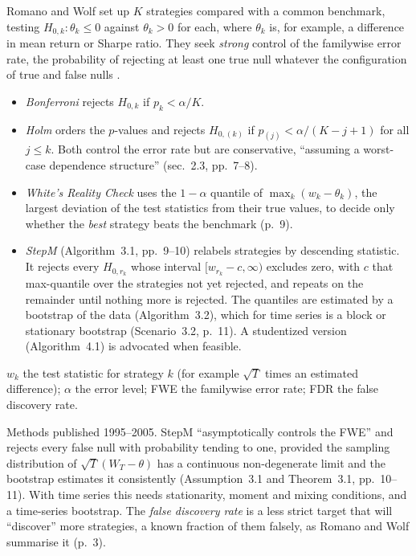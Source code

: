 \begin{qfmethod}\label{meth:multiple-testing-control}
 Romano and Wolf set up $K$ strategies compared with a common benchmark, testing $H_{0,k}:\theta_k\le0$ against $\theta_k>0$ for each, where $\theta_k$ is, for example, a difference in mean return or Sharpe ratio. They seek \emph{strong} control of the familywise error rate, the probability of rejecting at least one true null whatever the configuration of true and false nulls \citep[working paper of October 2003, sec.~2.2, pp.~6--7]{wide-romano-wolf-stepdown}.
\begin{itemize}
\item \emph{Bonferroni} rejects $H_{0,k}$ if $p_k<\alpha/K$.
\item \emph{Holm} orders the $p$-values and rejects $H_{0,(k)}$ if $p_{(j)}<\alpha/(K-j+1)$ for all $j\le k$. Both control the error rate but are conservative, ``assuming a worst-case dependence structure'' (sec.~2.3, pp.~7--8).
\item \emph{White's Reality Check} uses the $1-\alpha$ quantile of $\max_k(w_k-\theta_k)$, the largest deviation of the test statistics from their true values, to decide only whether the \emph{best} strategy beats the benchmark (p.~9).
\item \emph{StepM} (Algorithm~3.1, pp.~9--10) relabels strategies by descending statistic. It rejects every $H_{0,r_k}$ whose interval $[w_{r_k}-c,\infty)$ excludes zero, with $c$ that max-quantile over the strategies not yet rejected, and repeats on the remainder until nothing more is rejected. The quantiles are estimated by a bootstrap of the data (Algorithm~3.2), which for time series is a block or stationary bootstrap (Scenario~3.2, p.~11). A studentized version (Algorithm~4.1) is advocated when feasible.
\end{itemize}

 $w_k$ the test statistic for strategy $k$ (for example $\sqrt T$ times an estimated difference); $\alpha$ the error level; FWE the familywise error rate; FDR the false discovery rate.

 Methods published 1995--2005. StepM ``asymptotically controls the FWE'' and rejects every false null with probability tending to one, provided the sampling distribution of $\sqrt T(W_T-\theta)$ has a continuous non-degenerate limit and the bootstrap estimates it consistently (Assumption~3.1 and Theorem~3.1, pp.~10--11). With time series this needs stationarity, moment and mixing conditions, and a time-series bootstrap. The \emph{false discovery rate} is a less strict target that will ``discover'' more strategies, a known fraction of them falsely, as Romano and Wolf summarise it (p.~3).


\end{qfmethod}
